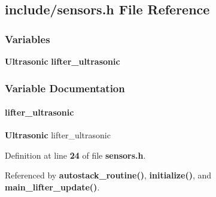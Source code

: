 \subsection{include/sensors.h File Reference}
\label{sensors_8h}
\subsubsection*{Variables}
\begin{DoxyCompactItemize}
\item 
\textbf{ Ultrasonic} \textbf{ lifter\+\_\+ultrasonic}
\end{DoxyCompactItemize}


\subsubsection{Variable Documentation}
\mbox{\label{sensors_8h_a5dfaf05eb7e97b2e29d04eb068f9c240}} 
\paragraph{lifter\+\_\+ultrasonic}
{\footnotesize\ttfamily \textbf{ Ultrasonic} lifter\+\_\+ultrasonic}



Definition at line \textbf{ 24} of file \textbf{ sensors.\+h}.



Referenced by \textbf{ autostack\+\_\+routine()}, \textbf{ initialize()}, and \textbf{ main\+\_\+lifter\+\_\+update()}.

